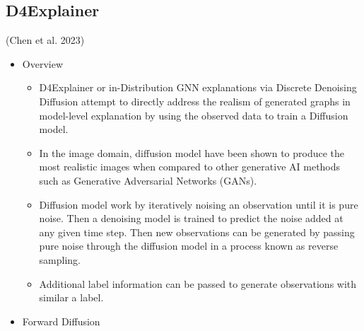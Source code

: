 \documentclass[
  11pt,
  letterpaper,
]{article}
\providecommand{\tightlist}{%
  \setlength{\itemsep}{0pt}\setlength{\parskip}{0pt}}\usepackage{longtable,booktabs,array}
\begin{document}
\hypertarget{d4explainer}{%
\subsection{D4Explainer}\label{d4explainer}}

(Chen et al. 2023)

\begin{itemize}
\item
  Overview

  \begin{itemize}
  \tightlist
  \item
    D4Explainer or in-Distribution GNN explanations via Discrete
    Denoising Diffusion attempt to directly address the realism of
    generated graphs in model-level explanation by using the observed
    data to train a Diffusion model.
  \item
    In the image domain, diffusion model have been shown to produce the
    most realistic images when compared to other generative AI methods
    such as Generative Adversarial Networks (GANs).
  \item
    Diffusion model work by iteratively noising an observation until it
    is pure noise. Then a denoising model is trained to predict the
    noise added at any given time step. Then new observations can be
    generated by passing pure noise through the diffusion model in a
    process known as reverse sampling.
  \item
    Additional label information can be passed to generate observations
    with similar a label.
  \end{itemize}
\item
  Forward Diffusion


\end{itemize}
\end{document}
